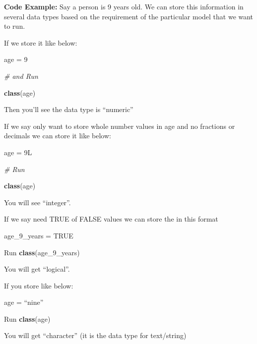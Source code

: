 \documentclass[
]{article}
\newenvironment{Shaded}{\begin{snugshade}}{\end{snugshade}}
\newcommand{\CommentTok}[1]{\textcolor[rgb]{0.56,0.35,0.01}{\textit{#1}}}
\newcommand{\ConstantTok}[1]{\textcolor[rgb]{0.56,0.35,0.01}{#1}}
\newcommand{\DecValTok}[1]{\textcolor[rgb]{0.00,0.00,0.81}{#1}}
\newcommand{\FunctionTok}[1]{\textcolor[rgb]{0.13,0.29,0.53}{\textbf{#1}}}
\newcommand{\NormalTok}[1]{#1}
\newcommand{\OtherTok}[1]{\textcolor[rgb]{0.56,0.35,0.01}{#1}}
\begin{document}
\textbf{Code Example:} Say a person is 9 years old. We can store this
information in several data types based on the requirement of the
particular model that we want to run.

If we store it like below:

\begin{Shaded}
\begin{Highlighting}[]
\NormalTok{age }\OtherTok{=} \DecValTok{9}

\CommentTok{\# and Run}

\FunctionTok{class}\NormalTok{(age)}
\end{Highlighting}
\end{Shaded}

Then you'll see the data type is ``numeric''

If we say only want to store whole number values in age and no fractions
or decimals we can store it like below:

\begin{Shaded}
\begin{Highlighting}[]
\NormalTok{age }\OtherTok{=}\NormalTok{ 9L }

\CommentTok{\# Run }

\FunctionTok{class}\NormalTok{(age)}
\end{Highlighting}
\end{Shaded}

You will see ``integer''.

If we say need TRUE of FALSE values we can store the in this format

\begin{Shaded}
\begin{Highlighting}[]
\NormalTok{age\_9\_years }\OtherTok{=} \ConstantTok{TRUE}

\NormalTok{Run }
\FunctionTok{class}\NormalTok{(age\_9\_years)}
\end{Highlighting}
\end{Shaded}

You will get ``logical''.

If you store like below:

\begin{Shaded}
\begin{Highlighting}[]
\NormalTok{age }\OtherTok{=}\NormalTok{ “nine”}

\NormalTok{Run }
\FunctionTok{class}\NormalTok{(age)}
\end{Highlighting}
\end{Shaded}

You will get ``character'' (it is the data type for text/string)
\end{document}
